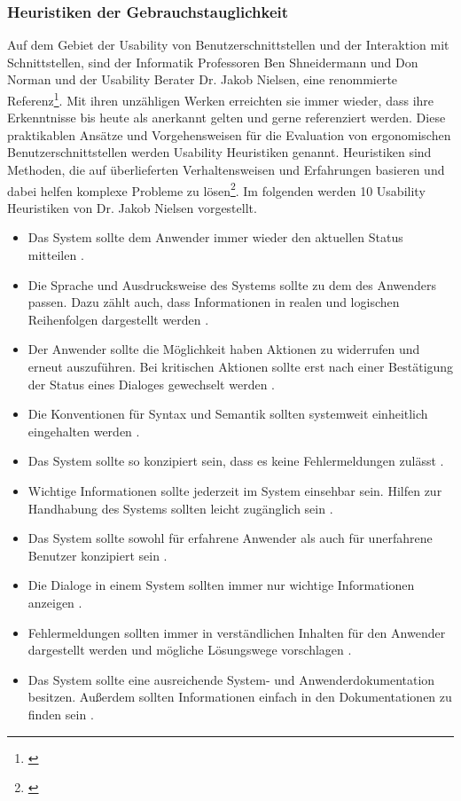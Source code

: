 
\subsubsection{Heuristiken der Gebrauchstauglichkeit}
\label{sec:heuristikenDerGebrauchstauglichkeit}
Auf dem Gebiet der Usability von Benutzerschnittstellen und der Interaktion mit Schnittstellen, sind der Informatik Professoren Ben Shneidermann und Don Norman und der Usability Berater Dr. Jakob Nielsen, eine renommierte Referenz\footnote{\cite[vgl.][]{Wong2018}}. Mit ihren unzähligen Werken erreichten sie immer wieder, dass ihre Erkenntnisse bis heute als anerkannt gelten und gerne referenziert werden. Diese praktikablen Ansätze und Vorgehensweisen für die Evaluation von ergonomischen Benutzerschnittstellen werden Usability Heuristiken genannt. Heuristiken sind Methoden, die auf überlieferten Verhaltensweisen und Erfahrungen basieren und dabei helfen komplexe Probleme zu lösen\footnote{\cite[vgl.][]{Heuristik2018}}. Im folgenden werden 10 Usability Heuristiken von Dr. Jakob Nielsen vorgestellt.
\begin{itemize}
    \item Das System sollte dem Anwender immer wieder den aktuellen Status mitteilen \citep[vgl.][]{Nielsen1995}.
    \item Die Sprache und Ausdrucksweise des Systems sollte zu dem des Anwenders passen. Dazu zählt auch, dass Informationen in realen und logischen Reihenfolgen dargestellt werden \citep[vgl.][]{Nielsen1995}.
    \item Der Anwender sollte die Möglichkeit haben Aktionen zu widerrufen und erneut auszuführen. Bei kritischen Aktionen sollte erst nach einer Bestätigung der Status eines Dialoges gewechselt werden \citep[vgl.][]{Nielsen1995}.
    \item Die Konventionen für Syntax und Semantik sollten systemweit einheitlich eingehalten werden \citep[vgl.][]{Nielsen1995}.
    \item Das System sollte so konzipiert sein, dass es keine Fehlermeldungen zulässt \citep[vgl.][]{Nielsen1995}.
    \item Wichtige Informationen sollte jederzeit im System einsehbar sein. Hilfen zur Handhabung des Systems sollten leicht zugänglich sein \citep[vgl.][]{Nielsen1995}.
    \item Das System sollte sowohl für erfahrene Anwender als auch für unerfahrene Benutzer konzipiert sein \citep[vgl.][]{Nielsen1995}.
    \item Die Dialoge in einem System sollten immer nur wichtige Informationen anzeigen \citep[vgl.][]{Nielsen1995}.
    \item Fehlermeldungen sollten immer in verständlichen Inhalten für den Anwender dargestellt werden und mögliche Lösungswege vorschlagen \citep[vgl.][]{Nielsen1995}.
    \item Das System sollte eine ausreichende System- und Anwenderdokumentation besitzen. Außerdem sollten Informationen einfach in den Dokumentationen zu finden sein \citep[vgl.][]{Nielsen1995}.
\end{itemize}

